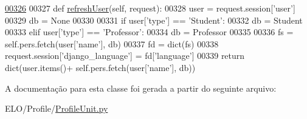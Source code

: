 \begin{DoxyCode}
\hypertarget{classProfile_1_1ProfileUnit_1_1BusProfile_l00326}{}\hyperlink{classProfile_1_1ProfileUnit_1_1BusProfile_a87c3d0374f709af7904656938eafd6d3}{00326} 
00327     \textcolor{keyword}{def }\hyperlink{classProfile_1_1ProfileUnit_1_1BusProfile_a87c3d0374f709af7904656938eafd6d3}{refreshUser}(self, request):
00328         user = request.session[\textcolor{stringliteral}{'user'}]
00329         db = \textcolor{keywordtype}{None}
00330 
00331         \textcolor{keywordflow}{if} user[\textcolor{stringliteral}{'type'}] == \textcolor{stringliteral}{'Student'}:
00332             db = Student
00333         \textcolor{keywordflow}{elif} user[\textcolor{stringliteral}{'type'}] == \textcolor{stringliteral}{'Professor'}:
00334             db = Professor
00335 
00336         fs = self.pers.fetch(user[\textcolor{stringliteral}{'name'}], db)
00337         fd = dict(fs)
00338         request.session[\textcolor{stringliteral}{'django\_language'}] = fd[\textcolor{stringliteral}{'language'}]
00339         \textcolor{keywordflow}{return} dict(user.items()+ self.pers.fetch(user[\textcolor{stringliteral}{'name'}], db))

\end{DoxyCode}


A documentação para esta classe foi gerada a partir do seguinte arquivo\-:\begin{DoxyCompactItemize}
\item 
E\-L\-O/\-Profile/\hyperlink{ProfileUnit_8py}{Profile\-Unit.\-py}\end{DoxyCompactItemize}

